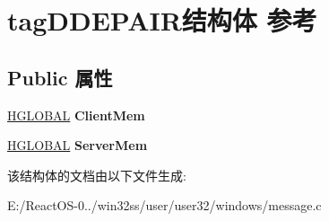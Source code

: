 \hypertarget{structtag_d_d_e_p_a_i_r}{}\section{tag\+D\+D\+E\+P\+A\+I\+R结构体 参考}
\label{structtag_d_d_e_p_a_i_r}
\subsection*{Public 属性}
\begin{DoxyCompactItemize}
\item 
\mbox{\label{structtag_d_d_e_p_a_i_r_ae15eaa42a107da589605cb09e9d54179}} 
\hyperlink{interfacevoid}{H\+G\+L\+O\+B\+AL} {\bfseries Client\+Mem}
\item 
\mbox{\label{structtag_d_d_e_p_a_i_r_a9db9c3b1e52ba43f35d9e3eefdd0db3e}} 
\hyperlink{interfacevoid}{H\+G\+L\+O\+B\+AL} {\bfseries Server\+Mem}
\end{DoxyCompactItemize}


该结构体的文档由以下文件生成\+:\begin{DoxyCompactItemize}
\item 
E\+:/\+React\+O\+S-\/0../win32ss/user/user32/windows/message.\+c\end{DoxyCompactItemize}
